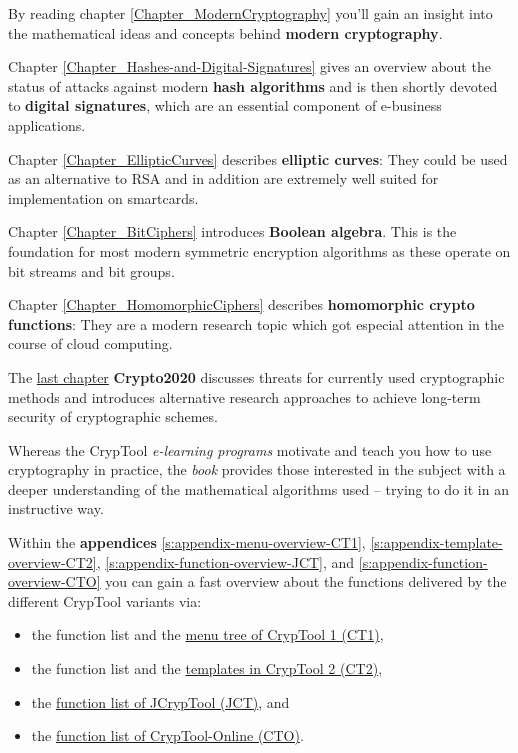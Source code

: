 By reading chapter \ref{Chapter_ModernCryptography}
you'll gain an insight into the mathematical ideas and concepts behind 
{\bf modern cryptography}.

Chapter \ref{Chapter_Hashes-and-Digital-Signatures} gives
an overview about the status of attacks against modern {\bf hash algorithms}
and is then shortly devoted to {\bf digital signatures}, 
which are an essential component of e-business applications.

Chapter \ref{Chapter_EllipticCurves} describes {\bf elliptic curves}:
They could be used as an alternative to RSA and in addition are extremely
well suited for implementation on smartcards.

Chapter \ref{Chapter_BitCiphers} introduces {\bf Boolean algebra}.
This is the foundation for most modern symmetric encryption algorithms
as these operate on bit streams and bit groups.

Chapter \ref{Chapter_HomomorphicCiphers} describes {\bf homomorphic crypto
functions}: They are a modern research topic which got especial attention
in the course of cloud computing.

The \hyperlink{Chapter_Crypto2020}{last chapter} {\bf Crypto2020}
discusses threats for currently used cryptographic methods and introduces
alternative research approaches to achieve long-term security
of cryptographic schemes.

Whereas the CrypTool \textit{e-learning programs} motivate
and teach you how to use cryptography in practice, the \textit{book} provides
those interested in the subject with a deeper understanding of the mathematical
algorithms used -- trying to do it in an instructive way.

Within the {\bf appendices}
\ref{s:appendix-menu-overview-CT1},
\ref{s:appendix-template-overview-CT2},
\ref{s:appendix-function-overview-JCT}, and
\ref{s:appendix-function-overview-CTO}
you can gain a fast overview about the functions delivered by the different
CrypTool variants via:
\begin{itemize}
  \item the function list and
        the \hyperlink{appendix-menu-overview-CT1}
                      {menu tree of CrypTool 1 (CT1)},
  \item the function list and
        the \hyperlink{appendix-template-overview-CT2}
                      {templates in CrypTool 2 (CT2)},
  \item the \hyperlink{appendix-function-overview-JCT}
                      {function list of JCrypTool (JCT)}, and
  \item the \hyperlink{appendix-function-overview-CTO}
                      {function list of CrypTool-Online (CTO)}.
\end{itemize}

